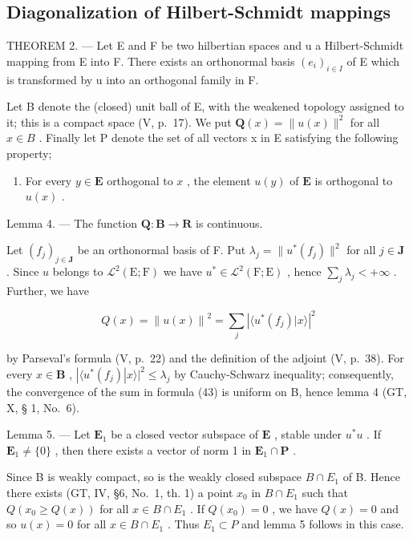 \subsection{Diagonalization of Hilbert-Schmidt mappings}

THEOREM 2. --- Let E and F be two hilbertian spaces and u a Hilbert-Schmidt mapping from E into F. There exists an orthonormal basis \((e_{i})_{i\in I}\) of E which is transformed by u into an orthogonal family in F.

Let B denote the (closed) unit ball of E, with the weakened topology assigned to it; this is a compact space (V, p.~17). We put \(\mathbf{Q}(x) = \|u(x)\|^{2}\) for all \(x \in B\) . Finally let P denote the set of all vectors x in E satisfying the following property;

\begin{enumerate}
\def\labelenumi{(\Alph{enumi})}
\setcounter{enumi}{7}
\tightlist
\item
  For every \(y \in \mathbf{E}\) orthogonal to \(x\) , the element \(u(y)\) of \(\mathbf{E}\) is orthogonal to \(u(x)\) .
\end{enumerate}

Lemma 4. --- The function \(\mathbf{Q}:\mathbf{B}\to \mathbf{R}\) is continuous.

Let \((f_j)_{j\in \mathbf{J}}\) be an orthonormal basis of F. Put \(\lambda_{j} = \| u^{*}(f_{j})\|^{2}\) for all \(j\in \mathbf{J}\) . Since \(u\) belongs to \(\mathcal{L}^2 (\mathrm{E};\mathrm{F})\) we have \(u^{*}\in \mathcal{L}^{2}(\mathrm{F};\mathrm{E})\) , hence \(\sum_{j}\lambda_{j} < + \infty\) . Further, we have

\[
Q (x) = \left\| u (x) \right\| ^ {2} = \sum_ {j} \left| \langle u ^ {*} (f _ {j}) | x \rangle \right| ^ {2}\tag{43}
\]

by Parseval's formula (V, p.~22) and the definition of the adjoint (V, p.~38). For every \(x \in \mathbf{B}\) , \(|\langle u^{*}(f_{j})|x\rangle|^{2} \leqslant \lambda_{j}\) by Cauchy-Schwarz inequality; consequently, the convergence of the sum in formula (43) is uniform on B, hence lemma 4 (GT, X, § 1, No.~6).

Lemma 5. --- Let \(\mathbf{E}_1\) be a closed vector subspace of \(\mathbf{E}\) , stable under \(u^*u\) . If \(\mathbf{E}_1 \neq \{0\}\) , then there exists a vector of norm 1 in \(\mathbf{E}_1 \cap \mathbf{P}\) .

Since B is weakly compact, so is the weakly closed subspace \(B \cap E_{1}\) of B. Hence there exists (GT, IV, §6, No.~1, th. 1) a point \(x_{0}\) in \(B \cap E_{1}\) such that \(Q(x_{0} \geqslant Q(x))\) for all \(x \in B \cap E_{1}\) . If \(Q(x_{0}) = 0\) , we have \(Q(x) = 0\) and so \(u(x) = 0\) for all \(x \in B \cap E_{1}\) . Thus \(E_{1} \subset P\) and lemma 5 follows in this case.


